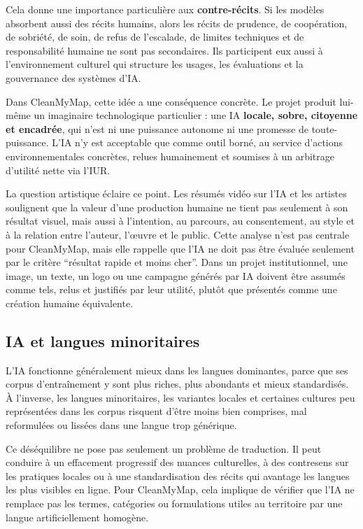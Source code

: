 \documentclass[
  10pt,
  a4paper,
  DIV=11,
  numbers=noendperiod,
  oneside]{scrreprt}
\let\oldtextbf\textbf
\renewcommand{\textbf}[1]{\oldtextbf{\textcolor{cmmnavy}{#1}}}
\begin{document}
Cela donne une importance particulière aux \textbf{contre-récits}. Si
les modèles absorbent aussi des récits humains, alors les récits de
prudence, de coopération, de sobriété, de soin, de refus de l'escalade,
de limites techniques et de responsabilité humaine ne sont pas
secondaires. Ils participent eux aussi à l'environnement culturel qui
structure les usages, les évaluations et la gouvernance des systèmes
d'IA.

Dans CleanMyMap, cette idée a une conséquence concrète. Le projet
produit lui-même un imaginaire technologique particulier : une IA
\textbf{locale, sobre, citoyenne et encadrée}, qui n'est ni une
puissance autonome ni une promesse de toute-puissance. L'IA n'y est
acceptable que comme outil borné, au service d'actions environnementales
concrètes, relues humainement et soumises à un arbitrage d'utilité nette
via l'IUR.

La question artistique éclaire ce point. Les résumés vidéo sur l'IA et
les artistes soulignent que la valeur d'une production humaine ne tient
pas seulement à son résultat visuel, mais aussi à l'intention, au
parcours, au consentement, au style et à la relation entre l'auteur,
l'œuvre et le public. Cette analyse n'est pas centrale pour CleanMyMap,
mais elle rappelle que l'IA ne doit pas être évaluée seulement par le
critère ``résultat rapide et moins cher''. Dans un projet
institutionnel, une image, un texte, un logo ou une campagne générés par
IA doivent être assumés comme tels, relus et justifiés par leur utilité,
plutôt que présentés comme une création humaine équivalente.

\subsection{IA et langues
minoritaires}\label{ia-et-langues-minoritaires}

L'IA fonctionne généralement mieux dans les langues dominantes, parce
que ses corpus d'entraînement y sont plus riches, plus abondants et
mieux standardisés. À l'inverse, les langues minoritaires, les variantes
locales et certaines cultures peu représentées dans les corpus risquent
d'être moins bien comprises, mal reformulées ou lissées dans une langue
trop générique.

Ce déséquilibre ne pose pas seulement un problème de traduction. Il peut
conduire à un effacement progressif des nuances culturelles, à des
contresens sur les pratiques locales ou à une standardisation des récits
qui avantage les langues les plus visibles en ligne. Pour CleanMyMap,
cela implique de vérifier que l'IA ne remplace pas les termes,
catégories ou formulations utiles au territoire par une langue
artificiellement homogène.
\end{document}
